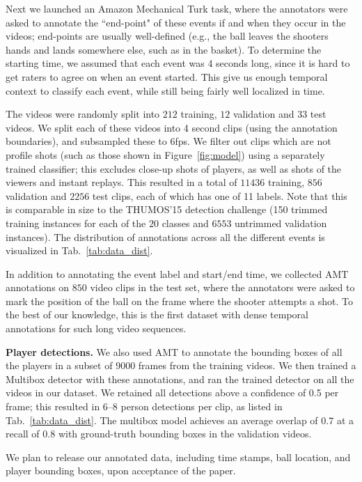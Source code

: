 Next we launched an Amazon Mechanical Turk task, where the
annotators were asked to annotate the ``end-point" of these events if and when
they occur in the videos; end-points are usually well-defined (e.g.,
the ball leaves the shooters hands and lands somewhere else, such as
in the basket).
To determine the starting time, we assumed that each event was 4
seconds long, since it is hard to get raters to agree on when an event
started. 
This give us enough temporal context to classify each event, while
still being fairly well localized in time.


The videos were randomly split into $212$ training, $12$ validation and $33$
test videos. 
We split each of these videos into 4 second clips (using the
annotation boundaries), and subsampled these to 6fps.
We filter out clips which are not profile shots (such as those shown in
Figure~\ref{fig:model}) using a separately trained classifier; this excludes close-up shots of players,  as
well as shots of the viewers and instant replays.
This resulted in a total of $11436$ training, $856$ validation
and $2256$ test clips, each of which has one of 11 labels.
Note that this is comparable in size to the THUMOS'15 detection
challenge (150 trimmed training instances for each of the $20$ classes and $6553$
untrimmed validation instances). The distribution of annotations across all the
different events is visualized in Tab.~\ref{tab:data_dist}.


In addition to annotating the event label and start/end time,
we collected AMT annotations on $850$ video clips in the test
set, where the annotators were asked to mark the position of the ball
on the frame where the shooter attempts a shot.
To the best of our
knowledge, this is the first dataset with dense temporal annotations for
such long video sequences.

\noindent \textbf{Player detections.}
We also used AMT to annotate the bounding boxes of all the players in a
subset of 9000 frames from the training videos.
We then trained a Multibox detector \cite{Szegedy_arxiv14}
with these annotations, and ran the trained detector on all the videos in our dataset.
We retained all detections above a confidence of 0.5 per frame;
this resulted in 6--8 person detections per clip, as listed in Tab.~\ref{tab:data_dist}.
The multibox model achieves an average overlap of $0.7$ at a recall of $0.8$
with ground-truth bounding boxes in the validation videos.

We plan to release our annotated data, including time stamps, ball
location, and player bounding boxes, upon acceptance of the paper.
